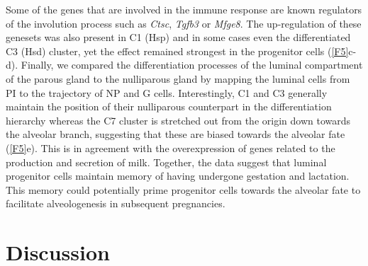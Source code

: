\documentclass[titlepage, 12pt, oneside]{amsart}
\begin{document}
Some of the genes that are involved in the immune response are known regulators of the involution process such as \textit{Ctsc}, \textit{Tgfb3} or \textit{Mfge8}\autocite{Clarkson2003}.
The up-regulation of these genesets was also present in C1 (Hsp) and in some cases even the differentiated C3 (Hsd) cluster, yet the effect remained strongest in the progenitor cells (\autoref{F5}c-d).
Finally, we compared the differentiation processes of the luminal compartment of the parous gland to the nulliparous gland by mapping the luminal cells from PI to the trajectory of NP and G cells.
Interestingly, C1 and C3 generally maintain the position of their nulliparous counterpart in the differentiation hierarchy whereas the C7 cluster is stretched out from the origin down towards the alveolar branch, suggesting that these are biased towards the alveolar fate (\autoref{F5}e).
This is in agreement with the overexpression of genes related to the production and secretion of milk.
Together, the data suggest that luminal progenitor cells maintain memory of having undergone gestation and lactation.
This memory could potentially prime progenitor cells towards the alveolar fate to facilitate alveologenesis in subsequent pregnancies.

\section{Discussion}
\end{document}
